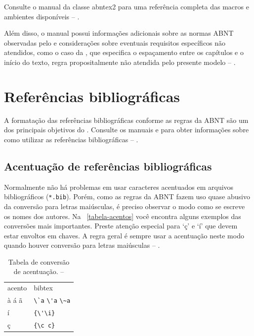 Consulte o manual da classe \textsf{abntex2} \cite{abntex2classe} para uma
referência completa das macros e ambientes disponíveis -- \showfont.

Além disso, o manual possui informações adicionais sobre as normas ABNT
observadas pelo \abnTeX{} e considerações sobre eventuais requisitos específicos
não atendidos, como o caso da \textcite[seção 5.2.2]{NBR14724:2011}, que
especifica o espaçamento entre os capítulos e o início do texto, regra
propositalmente não atendida pelo presente modelo -- \showfont.



\section{Referências bibliográficas}

A formatação das referências bibliográficas conforme as regras da ABNT são um
dos principais objetivos do \abnTeX{}. Consulte os manuais
\textcite{abntex2cite} e \textcite{abntex2cite-alf} para obter informações
sobre como utilizar as referências bibliográficas -- \showfont.



\subsection{Acentuação de referências bibliográficas}

Normalmente não há problemas em usar caracteres acentuados em arquivos
bibliográficos (\texttt{*.bib}). Porém, como as regras da ABNT fazem uso quase
abusivo da conversão para letras maiúsculas, é preciso observar o modo como se
escreve os nomes dos autores. Na ~\autoref{tabela-acentos} você encontra alguns
exemplos das conversões mais importantes. Preste atenção especial para `ç' e `í'
que devem estar envoltos em chaves. A regra geral é sempre usar a acentuação
neste modo quando houver conversão para letras maiúsculas -- \showfont.

\begin{table}[htbp]
    \caption[Tabela de conversão de acentuação]{Tabela de conversão de acentuação. -- \showfont}
    \label{tabela-acentos}
    \centering
    \begin{tabular}{ll}\hline\hline
        acento & \textsf{bibtex}                                                      \\
        à á ã  & \verb+\`a+ \verb+\'a+ \verb+\~a+ \\
        í      & \verb+{\'\i}+                                               \\
        ç      & \verb+{\c c}+                                               \\
        \hline\hline
    \end{tabular}
\end{table}



